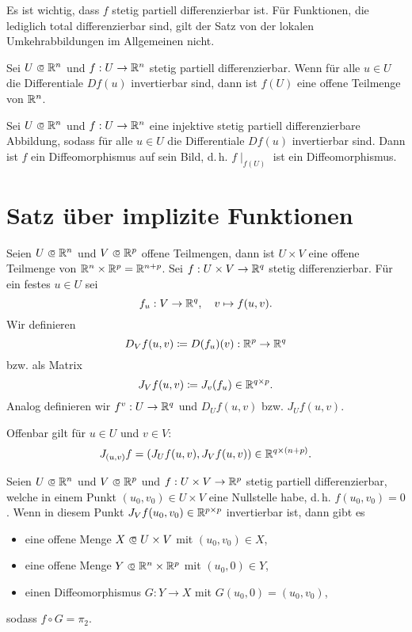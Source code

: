 \documentclass{cheat-sheet}
\newcommand\opn{\mathrel{\ooalign{$\subset$\cr
  \hidewidth\raise.1ex\hbox{$\circ\mkern.5mu$}\cr}}}
\begin{document}
\begin{bem}
Es ist wichtig, dass $f$ stetig partiell differenzierbar ist. Für Funktionen, die lediglich total differenzierbar sind, gilt der Satz von der lokalen Umkehrabbildungen im Allgemeinen nicht.
\end{bem}

\begin{kor}[Offenheitssatz]
Sei $U \opn \R^n$ und $f : U \to \mathbb{R}^n$ stetig partiell differenzierbar. Wenn für alle $u \in U$ die Differentiale $D f(u)$ invertierbar sind, dann ist $f(U)$ eine offene Teilmenge von $\mathbb{R}^n$.
\end{kor}

\begin{samepage}

\begin{kor}
Sei $U \opn \R^n$ und $f : U \to \mathbb{R}^n$ eine injektive stetig partiell differenzierbare Abbildung, sodass für alle $u \in U$ die Differentiale $D f(u)$ invertierbar sind. Dann ist $f$ ein Diffeomorphismus auf sein Bild, d.\,h. $f\mid_{f(U)}$ ist ein Diffeomorphismus.
\end{kor}


\section{Satz über implizite Funktionen}

\end{samepage}

\begin{nota}
Seien $U \opn \R^n$ und $V \opn \R^p$ offene Teilmengen, dann ist $U \times V$ eine offene Teilmenge von $\mathbb{R}^n \times \mathbb{R}^p = \mathbb{R}^{n + p}$. Sei $f : U \times V \to \mathbb{R}^q$ stetig differenzierbar. Für ein festes $u \in U$ sei
\[ f_u : V \to \mathbb{R}^q,\quad v \mapsto f(u, v). \]
Wir definieren
\[ D_V f(u, v) \coloneqq D(f_u)(v) : \mathbb{R}^p \to \mathbb{R}^q \]
bzw. als Matrix
\[ J_V f(u, v) \coloneqq J_v(f_u) \in \mathbb{R}^{q \times p}. \]
Analog definieren wir $f^v : U \to \mathbb{R}^q$ und $D_U f(u, v)$ bzw. $J_U f(u, v)$.
\end{nota}

\begin{bem}
Offenbar gilt für $u \in U$ und $v \in V$:
\[ J_{(u, v)} f = \left( J_U f(u, v), J_V f(u, v) \right) \in \mathbb{R}^{q \times (n + p)}. \]
\end{bem}

\begin{satz}
Seien $U \opn \R^n$ und $V \opn \R^p$ und $f : U \times V \to \mathbb{R}^p$ stetig partiell differenzierbar, welche in einem Punkt $(u_0, v_0) \in U \times V$ eine Nullstelle habe, d.\,h. $f(u_0, v_0) = 0$. Wenn in diesem Punkt $J_V f(u_0, v_0) \in \mathbb{R}^{p \times p}$ invertierbar ist, dann gibt es
\begin{itemize}
  \item eine offene Menge $X \opn U \times V$ mit $(u_0, v_0) \in X$,
  \item eine offene Menge $Y \opn \R^n \times \R^p$ mit $(u_0, 0) \in Y$,
  \item einen Diffeomorphismus $G : Y \to X$ mit $G(u_0, 0) = (u_0, v_0)$,
\end{itemize}
sodass $f \circ G = \pi_2.$
\end{satz}
\end{document}
